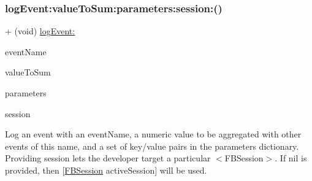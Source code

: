 \subsubsection{\texorpdfstring{log\+Event\+:value\+To\+Sum\+:parameters\+:session\+:()}{logEvent:valueToSum:parameters:session:()}\hspace{0.1cm}{\footnotesize\ttfamily [2/5]}}
{\footnotesize\ttfamily + (void) \hyperlink{interfaceFBAppEvents_a816373dd50bcf7381bf8194758ef8441}{log\+Event\+:} \begin{DoxyParamCaption}\item[{(N\+S\+String $\ast$)}]{event\+Name }\item[{valueToSum:(N\+S\+Number $\ast$)}]{value\+To\+Sum }\item[{parameters:(N\+S\+Dictionary $\ast$)}]{parameters }\item[{session:(\hyperlink{interfaceFBSession}{F\+B\+Session} $\ast$)}]{session }\end{DoxyParamCaption}}

Log an event with an event\+Name, a numeric value to be aggregated with other events of this name, and a set of key/value pairs in the parameters dictionary. Providing session lets the developer target a particular $<$\+F\+B\+Session$>$. If nil is provided, then {\ttfamily \mbox{[}\hyperlink{interfaceFBSession}{F\+B\+Session} active\+Session\mbox{]}} will be used.



